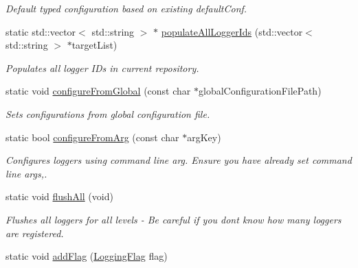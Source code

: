 \begin{DoxyCompactItemize}
\begin{DoxyCompactList}\small\item\em Default typed configuration based on existing default\-Conf. \end{DoxyCompactList}\item 
static std\-::vector$<$ std\-::string $>$ $\ast$ \hyperlink{classel_1_1Loggers_adea07ec6cbc1dfc50f939d69dcac7160}{populate\-All\-Logger\-Ids} (std\-::vector$<$ std\-::string $>$ $\ast$target\-List)
\begin{DoxyCompactList}\small\item\em Populates all logger I\-Ds in current repository. \end{DoxyCompactList}\item 
\hypertarget{classel_1_1Loggers_a9992995a85745639aa9aa5a2df2255f5}{static void \hyperlink{classel_1_1Loggers_a9992995a85745639aa9aa5a2df2255f5}{configure\-From\-Global} (const char $\ast$global\-Configuration\-File\-Path)}\label{classel_1_1Loggers_a9992995a85745639aa9aa5a2df2255f5}

\begin{DoxyCompactList}\small\item\em Sets configurations from global configuration file. \end{DoxyCompactList}\item 
static bool \hyperlink{classel_1_1Loggers_a28acf6f2b1ea7e5edd1b2560cde82406}{configure\-From\-Arg} (const char $\ast$arg\-Key)
\begin{DoxyCompactList}\small\item\em Configures loggers using command line arg. Ensure you have already set command line args,. \end{DoxyCompactList}\item 
\hypertarget{classel_1_1Loggers_a1834480e970c16817459ca3ee26b44b5}{static void \hyperlink{classel_1_1Loggers_a1834480e970c16817459ca3ee26b44b5}{flush\-All} (void)}\label{classel_1_1Loggers_a1834480e970c16817459ca3ee26b44b5}

\begin{DoxyCompactList}\small\item\em Flushes all loggers for all levels -\/ Be careful if you dont know how many loggers are registered. \end{DoxyCompactList}\item 
\hypertarget{classel_1_1Loggers_aedd2de02dd701b0f20ddaa10f1f728f1}{static void \hyperlink{classel_1_1Loggers_aedd2de02dd701b0f20ddaa10f1f728f1}{add\-Flag} (\hyperlink{namespaceel_a2784aacd04cb7816ac1c0b20fcbf83cb}{Logging\-Flag} flag)}\label{classel_1_1Loggers_aedd2de02dd701b0f20ddaa10f1f728f1}


\end{DoxyCompactItemize}
